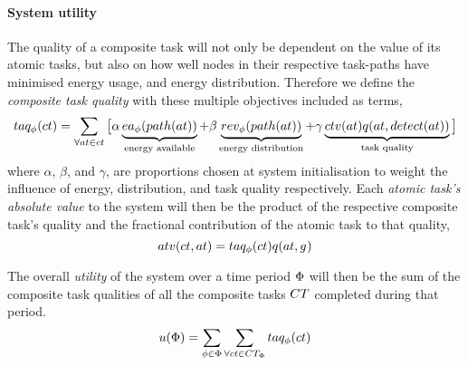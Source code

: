 \paragraph{System utility}
The quality of a composite task will not only be dependent on the value of its atomic tasks, but also on how well nodes in their respective task-paths have minimised energy usage, and energy distribution. Therefore we define the \textit{composite task quality} with these multiple objectives included as terms,
\begin{equation}
	\label{eq:ctv}
	\functionCompositeTaskQuality{}{} = 
	\sum\limits_{\forall \varAtomicTask{}{} \in \varCompositeTask{}{}}
	\big\lbrack
	\alpha\underbrace{\functionEnergyAvailable{\functionTaskArc{}{}}{}}_{\text{energy available}}
	+ \beta\underbrace{\functionEnergyVariability{\functionTaskArc{}{}}{}}_{\text{energy distribution}}
	+ 
	\gamma\underbrace{
		\functionComponentTaskValue{}{}
		\functionAtomicTaskQualitySignature{\varAtomicTask{}{}}{\functionDetectorRole{}{}}
	}_{\text{task quality}}
\big\rbrack
\end{equation}
where $\alpha$, $\beta$, and $\gamma$, are proportions chosen at system initialisation to weight the influence of energy, distribution, and task quality respectively. Each \textit{atomic task's absolute value} to the system will then be the product of the respective composite task's quality and the fractional contribution of the atomic task to that quality,
\begin{equation}
	\functionTaskAbsoluteValue{}{} = 
	\functionCompositeTaskQuality{}{}
	\functionAtomicTaskQualitySignature{}{}
\end{equation}

The overall \textit{ utility} of the system over a time period $\Phi$ will then be the sum of the composite task qualities of all the composite tasks $\setCompositeTask{}{}$ completed during that period.
	\begin{equation}
		\label{eq:system_utility}
		\functionSystemUtility{}{} = \sum\limits_{\varTime{}{} \in \setTime{}{}}
		\sum\limits_{\forall \varCompositeTask{}{} \in \setCompositeTask{\setTime{}{}}{}}
		\functionCompositeTaskQuality{}{}
	\end{equation}